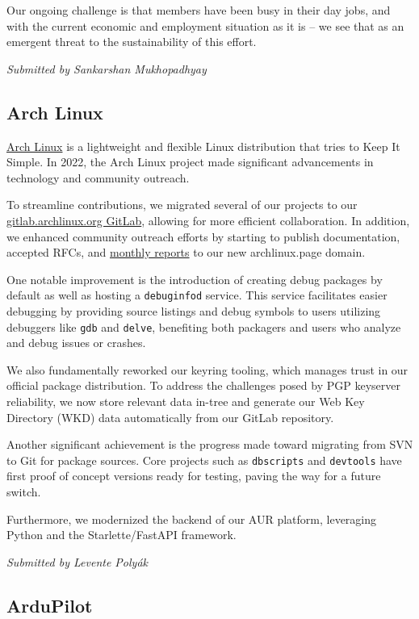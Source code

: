 \documentclass[a4paper]{report}
\begin{document}
Our ongoing challenge is that members have been busy in their day jobs, and with the current economic and employment situation as it is -- we see that as an emergent threat to the sustainability of this effort.

{\em Submitted by Sankarshan Mukhopadhyay}

\subsection{Arch Linux}

\href{https://archlinux.org/}{Arch Linux} is a lightweight and flexible Linux distribution that tries to Keep It Simple. In 2022, the Arch Linux project made significant advancements in technology and community outreach.

To streamline contributions, we migrated several of our projects to our \href{https://gitlab.archlinux.org}{gitlab.archlinux.org GitLab}, allowing for more efficient collaboration. In addition, we enhanced community outreach efforts by starting to publish documentation, accepted RFCs, and \href{https://monthly-reports.archlinux.page/}{monthly reports} to our new archlinux.page domain.

One notable improvement is the introduction of creating debug packages by default as well as hosting a {\tt debuginfod} service. This service facilitates easier debugging by providing source listings and debug symbols to users utilizing debuggers like {\tt gdb} and {\tt delve}, benefiting both packagers and users who analyze and debug issues or crashes.

We also fundamentally reworked our keyring tooling, which manages trust in our official package distribution. To address the challenges posed by PGP keyserver reliability, we now store relevant data in-tree and generate our Web Key Directory
(WKD) data automatically from our GitLab repository.

Another significant achievement is the progress made toward migrating from SVN to Git for package sources. Core projects such as {\tt dbscripts} and {\tt devtools} have first proof of concept versions ready for testing, paving the way for a future switch.

Furthermore, we modernized the backend of our AUR platform, leveraging Python and the Starlette/FastAPI framework.

{\em Submitted by Levente Polyák}

\subsection{ArduPilot}
\end{document}
